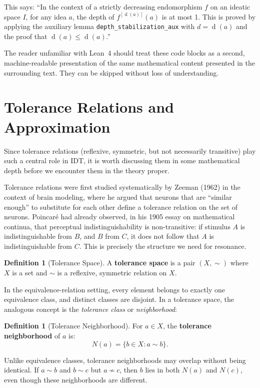\documentclass[11pt,openany]{book}
\theoremstyle{definition}
\newtheorem{definition}[axiom]{Definition}
\theoremstyle{plain}
\theoremstyle{remark}
\newcommand{\depth}{\operatorname{d}}       %
\begin{document}
This says: ``In the context of a strictly decreasing endomorphism $f$ on an ideatic space $I$, for any idea $a$, the depth of $f^{[\depth(a)]}(a)$ is at most 1. This is proved by applying the auxiliary lemma \texttt{depth\_stabilization\_aux} with $d = \depth(a)$ and the proof that $\depth(a) \leq \depth(a)$.''

The reader unfamiliar with Lean~4 should treat these code blocks as a second, machine-readable presentation of the same mathematical content presented in the surrounding text. They can be skipped without loss of understanding.

\section{Tolerance Relations and Approximation}

Since tolerance relations (reflexive, symmetric, but not necessarily transitive) play such a central role in IDT, it is worth discussing them in some mathematical depth before we encounter them in the theory proper.

Tolerance relations were first studied systematically by Zeeman (1962) in the context of brain modeling, where he argued that neurons that are ``similar enough'' to substitute for each other define a tolerance relation on the set of neurons. Poincar\'e had already observed, in his 1905 essay on mathematical continua, that perceptual indistinguishability is non-transitive: if stimulus $A$ is indistinguishable from $B$, and $B$ from $C$, it does not follow that $A$ is indistinguishable from $C$. This is precisely the structure we need for resonance.

\begin{definition}[Tolerance Space]
A \textbf{tolerance space} is a pair $(X, \sim)$ where $X$ is a set and $\sim$ is a reflexive, symmetric relation on $X$.
\end{definition}

In the equivalence-relation setting, every element belongs to exactly one equivalence class, and distinct classes are disjoint. In a tolerance space, the analogous concept is the \emph{tolerance class} or \emph{neighborhood}:

\begin{definition}[Tolerance Neighborhood]
For $a \in X$, the \textbf{tolerance neighborhood} of $a$ is:
\[
N(a) = \{b \in X : a \sim b\}.
\]
\end{definition}

Unlike equivalence classes, tolerance neighborhoods may overlap without being identical. If $a \sim b$ and $b \sim c$ but $a \not\sim c$, then $b$ lies in both $N(a)$ and $N(c)$, even though these neighborhoods are different.
\end{document}
